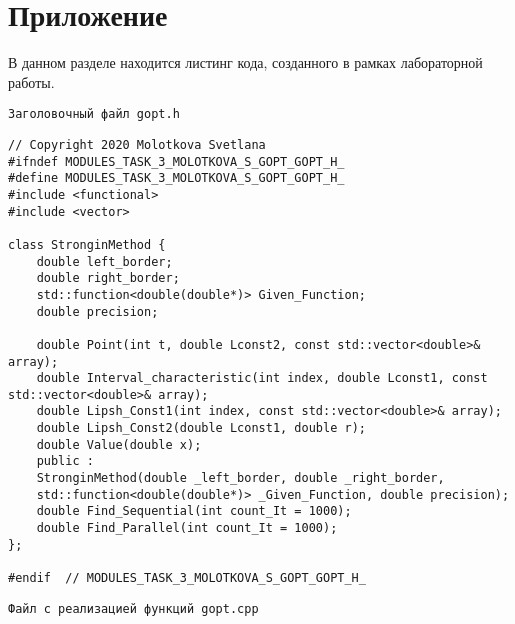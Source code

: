 \documentclass{report}
\begin{document}
\section*{Приложение}
В данном разделе находится листинг кода, созданного в рамках лабораторной работы. \par
\texttt{Заголовочный файл gopt.h}
\begin{lstlisting}
// Copyright 2020 Molotkova Svetlana
#ifndef MODULES_TASK_3_MOLOTKOVA_S_GOPT_GOPT_H_
#define MODULES_TASK_3_MOLOTKOVA_S_GOPT_GOPT_H_
#include <functional>
#include <vector>

class StronginMethod {
	double left_border;
	double right_border;
	std::function<double(double*)> Given_Function;
	double precision;
	
	double Point(int t, double Lconst2, const std::vector<double>& array);
	double Interval_characteristic(int index, double Lconst1, const std::vector<double>& array);
	double Lipsh_Const1(int index, const std::vector<double>& array);
	double Lipsh_Const2(double Lconst1, double r);
	double Value(double x);
	public :
	StronginMethod(double _left_border, double _right_border,
	std::function<double(double*)> _Given_Function, double precision);
	double Find_Sequential(int count_It = 1000);
	double Find_Parallel(int count_It = 1000);
};

#endif  // MODULES_TASK_3_MOLOTKOVA_S_GOPT_GOPT_H_

\end{lstlisting}
\texttt{Файл с реализацией функций gopt.cpp}
\end{document}
